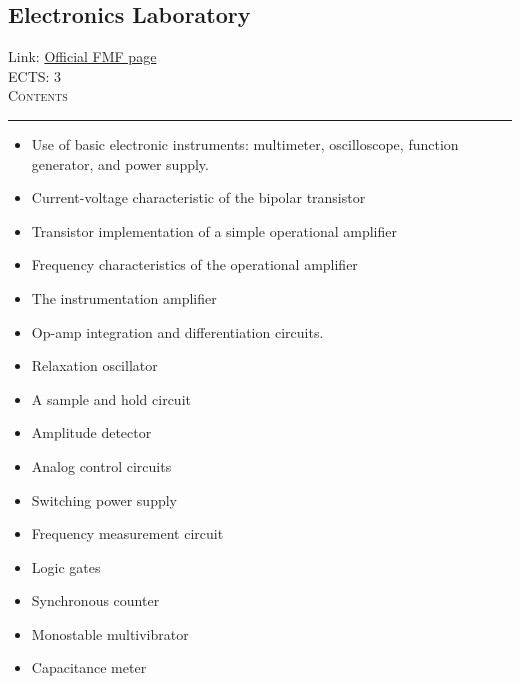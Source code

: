 \documentclass[11pt, a4paper]{article}
\newenvironment{course}[3]{
\subsection{#1}%
Link: \href{#2}{Official FMF page}\\%
ECTS: #3%
\vspace{1ex}
\\
{\large \textsc{Contents}}\\[-0.9ex]%
\rule{\textwidth}{0.5pt}
\vspace{-3ex}
}
{}
\newenvironment{chapter}[1]{
\begin{tcolorbox}[title=#1, breakable]
}
{\end{tcolorbox}}
\begin{document}
\begin{course}{Electronics Laboratory}{https://www.fmf.uni-lj.si/en/study-physics/programmes/1fiz/2020/7000777/courses/1136/}{3}
    \label{electronics-laboratory}

    \begin{chapter}{List of labs and projects}
        \begin{itemize}
        
            \item Use of basic electronic instruments: multimeter, oscilloscope, function generator, and power supply.

            \item Current-voltage characteristic of the bipolar transistor

            \item Transistor implementation of a simple operational amplifier

            \item Frequency characteristics of the operational amplifier

            \item The instrumentation amplifier

            \item Op-amp integration and differentiation circuits.

            \item Relaxation oscillator

            \item A sample and hold circuit

            \item Amplitude detector

            \item Analog control circuits

            \item Switching power supply

            \item Frequency measurement circuit

            \item Logic gates

            \item Synchronous counter

            \item Monostable multivibrator

            \item Capacitance meter


\end{itemize}
\end{chapter}
\end{course}
\end{document}
